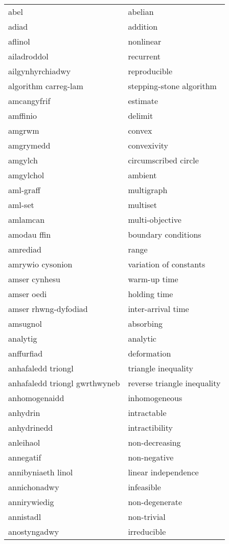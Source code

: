 \begin{supertabular}{p{0.22\textwidth}p{0.22\textwidth}}
\midrule
abel & abelian \\
adiad & addition \\
aflinol & nonlinear \\
ailadroddol & recurrent \\
ailgynhyrchiadwy & reproducible \\
algorithm carreg-lam & stepping-stone algorithm \\
amcangyfrif & estimate \\
amffinio & delimit \\
amgrwm & convex \\
amgrymedd & convexivity \\
amgylch & circumscribed circle \\
amgylchol & ambient \\
aml-graff & multigraph \\
aml-set & multiset \\
amlamcan & multi-objective \\
amodau ffin & boundary conditions \\
amrediad & range \\
amrywio cysonion & variation of constants \\
amser cynhesu & warm-up time \\
amser oedi & holding time \\
amser rhwng-dyfodiad & inter-arrival time \\
amsugnol & absorbing \\
analytig & analytic \\
anffurfiad & deformation \\
anhafaledd triongl & triangle inequality \\
anhafaledd triongl gwrthwyneb & reverse triangle inequality \\
anhomogenaidd & inhomogeneous \\
anhydrin & intractable \\
anhydrinedd & intractibility \\
anleihaol & non-decreasing \\
annegatif & non-negative \\
annibyniaeth linol & linear independence \\
annichonadwy & infeasible \\
annirywiedig & non-degenerate \\
annistadl & non-trivial \\
anostyngadwy & irreducible \\

\end{supertabular}

